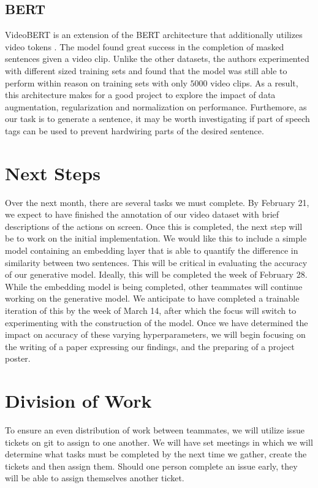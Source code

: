\documentclass[10pt]{article}
\begin{document}
\subsection{BERT}
VideoBERT is an extension of the BERT architecture that additionally utilizes video tokens \cite{sun2019videobert}. 
The model found great success in the completion of masked sentences given a video clip. Unlike the other datasets, the authors experimented 
with different sized training sets and found that the model was still able to perform within reason on training sets
with only $5000$ video clips. As a result, this architecture makes for a good project to explore the impact of data augmentation, regularization and normalization 
on performance. Furthemore, as our task is to generate a sentence, it may be worth investigating if part of speech tags can be used
to prevent hardwiring parts of the desired sentence. 

\section{Next Steps}
Over the next month, there are several tasks we must complete. By February 21, we expect to have finished the annotation of our video
dataset with brief descriptions of the actions on screen. Once this is completed, the next step will be to work on the initial implementation.
We would like this to include a simple model containing an embedding layer that is able to quantify the difference in similarity between
two sentences. This will be critical in evaluating the accuracy of our generative model. Ideally, this will be completed the week of February 28.
While the embedding model is being completed, other teammates will continue working on the generative model. We anticipate to have completed
a trainable iteration of this by the week of March 14, after which the focus will switch to experimenting with the construction of the model. Once we
have determined the impact on accuracy of these varying hyperparameters, we will begin focusing on the writing of a paper expressing our findings, and the
preparing of a project poster.

\section{Division of Work}
To ensure an even distribution of work between teammates, we will utilize issue tickets on git to assign to one another. We will have set meetings in which
we will determine what tasks must be completed by the next time we gather, create the tickets and then assign them. Should one person complete an issue early,
they will be able to assign themselves another ticket.


\end{document}
